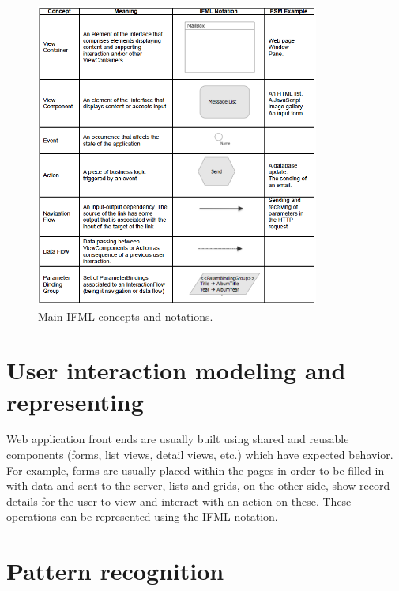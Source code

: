 \vspace{0.5cm}
\begin{figure}[htbp]
  \centering
    \includegraphics[height=10cm]{images/ifml.jpg}
  \caption{Main IFML concepts and notations.}
  \label{fig:ifml}
\end{figure}
\vspace{0.5cm}

\section{User interaction modeling and representing}

Web application front ends are usually built using
shared and reusable components (forms, list views, detail views, etc.) which have expected behavior.
For example, forms are usually placed within the pages in order to be filled in with data and sent to the server, lists and grids, on the other side, show record details for the user to view and interact with an action on these.
These operations can be represented using the IFML notation.

\section{Pattern recognition}



